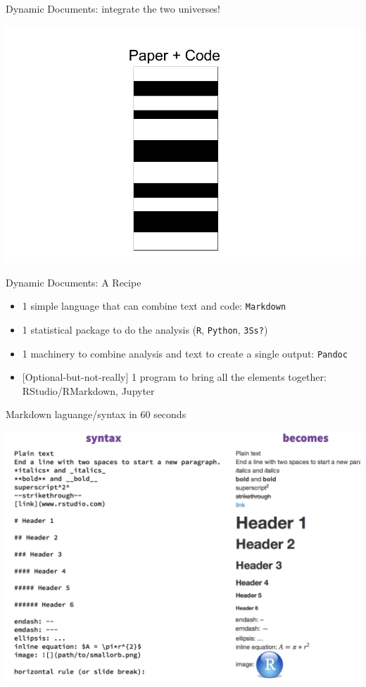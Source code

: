 \begin{frame}{Dynamic Documents: integrate the two universes!}

\includegraphics{./One universe.png}

\end{frame}

\begin{frame}[fragile]{Dynamic Documents: A Recipe}

\begin{itemize}
\tightlist
\item
  1 simple language that can combine text and code: \texttt{Markdown}
\item
  1 statistical package to do the analysis (\texttt{R}, \texttt{Python},
  \texttt{3S\textquotesingle{}s?})
\item
  1 machinery to combine analysis and text to create a single output:
  \texttt{Pandoc}
\item
  {[}Optional-but-not-really{]} 1 program to bring all the elements
  together: RStudio/RMarkdown, Jupyter
\end{itemize}

\end{frame}

\begin{frame}{Markdown laguange/syntax in 60 seconds}

\includegraphics{./RStudioCS.png}

\end{frame}

